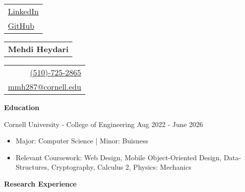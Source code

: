 \documentclass{article}
\begin{document}
\begin{spacing}{1.15}
{\large\begin{tabular}[c]{l}
    \underline{\href{https://www.linkedin.com/in/mehdi-heydari}{LinkedIn}} \\
    \underline{\href{https://github.com/MehdiMHeydari}{GitHub}}
\end{tabular}}\hfill
{\huge\begin{tabular}[c]{c}
    \bfseries  Mehdi Heydari
\end{tabular}}\hfill
{\large\begin{tabular}[c]{r}
    \underline{\href{tel:5107252865}{(510)-725-2865}} \\
    \underline{\href{mailto:mmh287@cornell.edu}{mmh287@cornell.edu}}
\end{tabular}}
\vspace*{0.35cm}


\noindent\large{\bfseries Education \vspace*{0.2cm}}

\normalsize{
\noindent Cornell University - College of Engineering \hfill Aug 2022 - June 2026
}
\small{
\begin{itemize}[noitemsep]
    \item Major: Computer Science | Minor: Buisness %
    \item Relevant Coursework: Web Design, Mobile Object-Oriented Design, Data-Structures, Cryptography, Calculus 2, Physics: Mechanics
\end{itemize}
\vspace*{0.2cm}
}



\noindent\large{\bfseries Research Experience \vspace*{0.2cm}}


\end{spacing}
\end{document}
